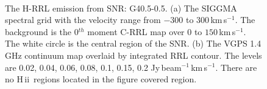 \documentclass[manuscript]{aastex61}
\newcommand{\hii}{{\rm H\,}{{\sc ii}}}
\newcommand{\kms}{\,km\,s$^{-1}$}
\begin{document}
\begin{figure}[H]
\centering
{}
\\
\caption{The H-RRL emission from SNR: G40.5-0.5.
          (a) The SIGGMA spectral grid with the velocity range from $-300$ to $300$\kms.
	  The background is the 0$^{th}$ moment C-RRL map over $0$ to $150$\kms.
	  The white circle is the central region of the SNR.
	  (b) The VGPS 1.4 GHz continuum map overlaid by integrated RRL contour.
	  The levels are 0.02, 0.04, 0.06, 0.08, 0.1, 0.15, 0.2 Jy\,beam$^{-1}$\kms.
	  There are no \hii\ regions located in the figure covered region.
	  }
\label{fig_snr-g405}
\end{figure}
\end{document}
